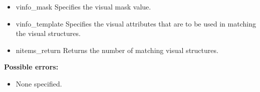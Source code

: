\documentclass{report}
\begin{document}
\begin{itemize}
            \begin{itemize}
                \item vinfo\_mask Specifies the visual mask value.
                \item vinfo\_template Specifies the visual attributes that are to be used in matching the visual structures.
                \item nitems\_return Returns the number of matching visual structures.
            \end{itemize}

            \bigbreak \noindent
            \textbf{Possible errors:}
            \begin{itemize}
                \item None specified.
            \end{itemize}


\end{itemize}
\end{document}
